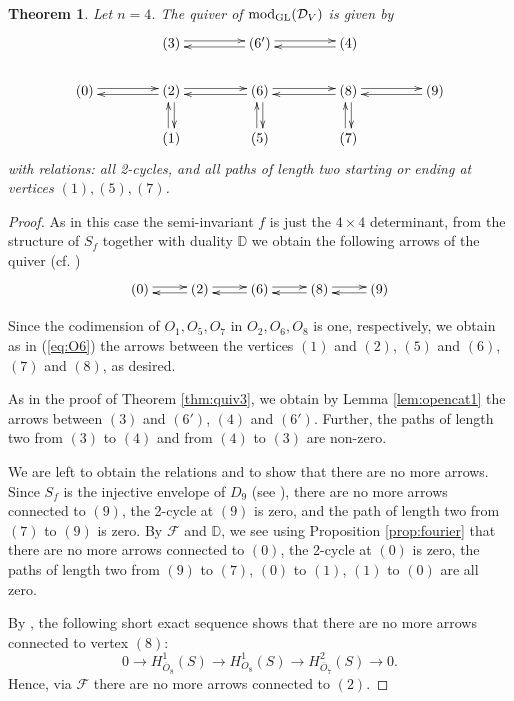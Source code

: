 \documentclass[11pt,reqno]{amsart}
\newcommand{\D}{\mathcal{D}}
\newcommand{\tn}{\textnormal}
\newcommand{\GL}{\operatorname{GL}}
\newcommand{\bb}[1]{\mathbb{#1}}
\newcommand{\mc}[1]{\mathcal{#1}}
\newcommand{\ol}[1]{\overline{#1}}
\newtheorem{theorem}{Theorem}[section]
\numberwithin{equation}{section}
\begin{document}
\begin{theorem}\label{thm:quiv4}
Let $n=4$. The quiver of $\tn{mod}_{\GL}(\D_V)$ is given by
\[\xymatrix@R-0.5pc@C+1.6pc{
& (3) \ar@<0.5ex>[r] & \ar@<0.5ex>[l] (6') \ar@<0.5ex>[r] & \ar@<0.5ex>[l] (4) & \\
(0) \ar@<0.5ex>[r] & \ar@<0.5ex>[l] (2) \ar@<0.5ex>[r] \ar@<0.5ex>[d] & \ar@<0.5ex>[l] \ar@<0.5ex>[d] (6) \ar@<0.5ex>[r] & \ar@<0.5ex>[l] \ar@<0.5ex>[d] (8) \ar@<0.5ex>[r] & \ar@<0.5ex>[l] (9) \\
& (1) \ar@<0.5ex>[u] & (5) \ar@<0.5ex>[u] & (7) \ar@<0.5ex>[u] & 
}\]
with relations: all 2-cycles, and all paths of length two starting or ending at vertices $(1), (5), (7)$.
\end{theorem}

\begin{proof}
As in this case the semi-invariant $f$ is just the $4\times 4$ determinant, from the structure of $S_f$  together with duality $\bb{D}$ we obtain the following arrows of the quiver (cf. \cite[Theorem 5.4]{lHorincz2019categories})
\[\xymatrix{
(0) \ar@<0.5ex>[r] & \ar@<0.5ex>[l] (2) \ar@<0.5ex>[r]  & \ar@<0.5ex>[l] (6) \ar@<0.5ex>[r] & \ar@<0.5ex>[l] (8) \ar@<0.5ex>[r] & \ar@<0.5ex>[l] (9)
}\]

Since the codimension of $O_1, O_5, O_7$ in $O_2, O_6, O_8$ is one, respectively, we obtain as in (\ref{eq:O6}) the arrows between the vertices $(1)$ and $(2)$, $(5)$ and $(6)$, $(7)$ and $(8)$, as desired.

As in the proof of Theorem \ref{thm:quiv3}, we obtain by Lemma \ref{lem:opencat1} the arrows between $(3)$ and $(6')$, $(4)$ and $(6')$. Further, the paths of length two from $(3)$ to $(4)$ and from $(4)$ to $(3)$ are non-zero.

We are left to obtain the relations and to show that there are no more arrows. Since $S_f$ is the injective envelope of $D_9$ (see \cite[Lemma 2.4]{binary}), there are no more arrows connected to $(9)$, the 2-cycle at $(9)$ is zero, and the path of length two from $(7)$ to $(9)$ is zero. By $\mc{F}$ and $\bb{D}$, we see using Proposition \ref{prop:fourier} that there are no more arrows connected to $(0)$, the 2-cycle at $(0)$ is zero, the paths of length two from $(9)$ to $(7)$, $(0)$ to $(1)$, $(1)$ to $(0)$ are all zero.

By \cite[Lemma 3.11]{lHorincz2019categories}, the following short exact sequence shows that there are no more arrows connected to vertex $(8)$:
\begin{equation}\label{eq:O8}
0 \to H^1_{\ol{O}_8}(S) \to H^1_{O_8}(S) \to H^2_{\ol{O}_7}(S) \to 0.
\end{equation}
Hence, via $\mc{F}$ there are no more arrows connected to $(2)$.


\end{proof}
\end{document}

